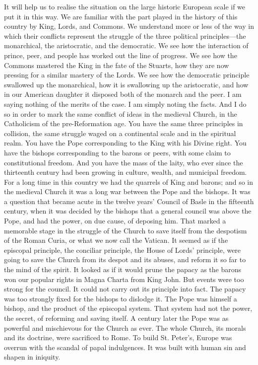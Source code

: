 \documentclass[12pt,a5paper,twoside]{book}
\begin{document}
It will help us to realise the situation on the large 
historic European scale if we put it in this way. We 
are familiar with the part played in the history of this 
country by King, Lords, and Commons. We understand 
more or less of the way in which their conflicts 
represent the struggle of the three political 
principles---the 
monarchical, the aristocratic, and the democratic. 
We see how the interaction of prince, peer, and 
people has worked out the line of progress. We see 
how the Commons mastered the King in the fate of 
the Stuarts, how they are now pressing for a similar 
mastery of the Lords. We see how the democratic 
principle swallowed up the monarchical, how it is 
swallowing up the aristocratic, and how in our 
American daughter it disposed both of the monarch 
and the peer. I am saying nothing of the merits of 
the case. I am simply noting the facts. And I do 
so in order to mark the same conflict of ideas in the 
medieval Church, in the Catholicism of the pre-Reformation 
age. You have the same three principles 
in collision, the same struggle waged on a 
continental scale and in the spiritual realm. You 
have the Pope corresponding to the King with his 
Divine right. You have the bishops corresponding 
to the barons or peers, with some claim to constitutional 
freedom. And you have the mass of the 
laity, who ever since the thirteenth century had been 
growing in culture, wealth, and municipal freedom. 
For a long time in this country we had the quarrels 
of King and barons; and so in the medieval Church 
it was a long war between the Pope and the bishops. 
It was a question that became acute in the twelve 
years' Council of Basle in the fifteenth century, when 
it was decided by the bishops that a general council 
was above the Pope, and had the power, on due cause, 
of deposing him. That marked a memorable stage in 
the struggle of the Church to save itself from the 
despotism of the Roman Curia, or what we now call 
the Vatican. It seemed as if the episcopal principle, 
the conciliar principle, the House of Lords' principle, 
were going to save the Church from its despot and its 
abuses, and reform it so far to the mind of the spirit. 
It looked as if it would prune the papacy as the barons 
won our popular rights in Magna Charta from King 
John. But events were too strong for the council. 
It could not carry out its principle into fact. The 
papacy was too strongly fixed for the bishops to dislodge 
it. The Pope was himself a bishop, and the 
product of the episcopal system. That system had 
not the power, the secret, of reforming and saving 
itself. A century later the Pope was as powerful 
and mischievous for the Church as ever. The whole 
Church, its morals and its doctrine, were sacrificed to 
Rome. To build St. Peter's, Europe was overrun 
with the scandal of papal indulgences. It was built 
with human sin and shapen in iniquity. 
\end{document}
